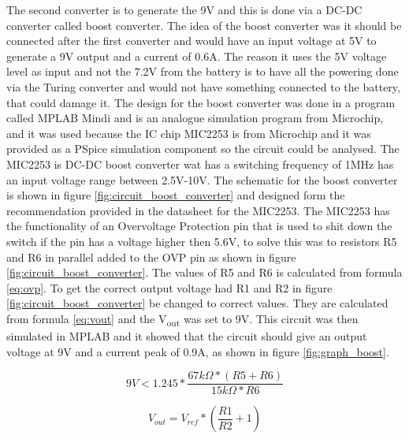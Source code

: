 \documentclass[11pt, titlepage]{article} %
\begin{document}
The second converter is to generate the 9V and this is done via a DC-DC converter called boost converter. The idea of the boost converter was it should be connected after the first converter and would have an input voltage at 5V to generate a 9V output and a current of 0.6A. The reason it uses the 5V voltage level as input and not the 7.2V from the battery is to have all the powering done via the Turing converter and would not have something connected to the battery, that could damage it. The design for the boost converter was done in a program called MPLAB Mindi and is an analogue simulation program from Microchip, and it was used because the IC chip MIC2253 is from Microchip and it was provided as a PSpice simulation component so the circuit could be analysed. The MIC2253 is DC-DC boost converter wat has a switching frequency of 1MHz has an input voltage range between 2.5V-10V. The schematic for the boost converter is shown in figure \ref{fig:circuit_boost_converter} and designed form the recommendation provided in the datasheet for the MIC2253. The MIC2253 has the functionality of an Overvoltage Protection pin that is used to shit down the switch if the pin has a voltage higher then 5.6V, to solve this was to resistors R5 and R6 in parallel added to the OVP pin as shown in figure \ref{fig:circuit_boost_converter}. The values of R5 and R6 is calculated from formula \ref{eq:ovp}. To get the correct output voltage had R1 and R2 in figure \ref{fig:circuit_boost_converter} be changed to correct values. They are calculated from formula \ref{eq:vout} and the V\textsubscript{out} was set to 9V. This circuit was then simulated in MPLAB and it showed that the circuit should give an output voltage at 9V and a current peak of 0.9A, as shown in figure \ref{fig:graph_boost}. 

\begin{equation}
	9V < 1.245 * \frac{67k \Omega * (R5 + R6) }{15k \Omega * R6}	
	\label{eq:ovp} 	
\end{equation}

\begin{equation}
	V_{out} = V_{ref} * (\frac{R1}{R2} + 1)
	\label{eq:vout}
\end{equation}
\end{document}
